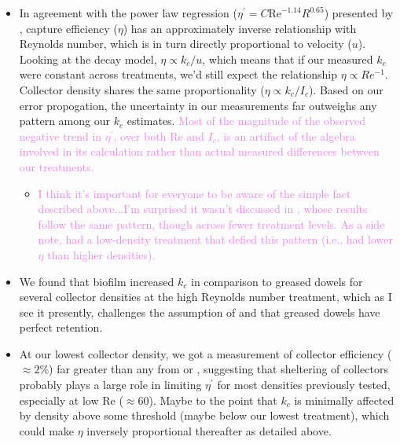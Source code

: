 \documentclass{article}
\newcommand\Rey{\mathrm{Re}}
\begin{document}
\begin{itemize}
    \item In agreement with the power law regression ($\eta^\prime = C\Rey^{-1.14}R^{0.65}$) presented by \cite{Fauria_2015}, capture efficiency ($\eta$) has an approximately inverse relationship with Reynolds number, which is in turn directly proportional to velocity ($u$). Looking at the decay model, $\eta \propto k_c/u$, which means that if our measured $k_c$ were constant across treatments, we'd still expect the relationship $\eta \propto Re^{-1}$. Collector density shares the same proportionality ($\eta \propto k_c/I_c$). Based on our error propogation, the uncertainty in our measurements far outweighs any pattern among our $k_c$ estimates. \textcolor{violet}{Most of the magnitude of the observed negative trend in $\eta^\prime$, over both $\Rey$ and $I_c$, is an artifact of the algebra involved in its calculation rather than actual measured differences between our treatments.} 
        \begin{itemize}
            \item  \textcolor{violet}{I think it's important for everyone to be aware of the simple fact described above...I'm surprised it wasn't discussed in \cite{Fauria_2015}, whose results follow the same pattern, though across fewer treatment levels. As a side note, \cite{Purich_2007} had a low-density treatment that defied this pattern (i.e., had lower $\eta$ than higher densities).} 
        \end{itemize}
    \item We found that biofilm increased $k_c$ in comparison to greased dowels for several collector densities at the high Reynolds number treatment, which as I see it presently, challenges the assumption of \cite{Palmer_2004} and \cite{Fauria_2015} that greased dowels have perfect retention.
    \item At our lowest collector density, we got a measurement of collector efficiency ($\approx2\%$) far greater than any from \cite{Fauria_2015} or \cite{Purich_2007}, suggesting that sheltering of collectors probably plays a large role in limiting $\eta^\prime$ for most densities previously tested, especially at low Re ($\approx60$). Maybe to the point that $k_c$ is minimally affected by density above some threshold (maybe below our lowest treatment), which could make $\eta$ inversely proportional thereafter as detailed above.
\end{itemize}



\end{document}
